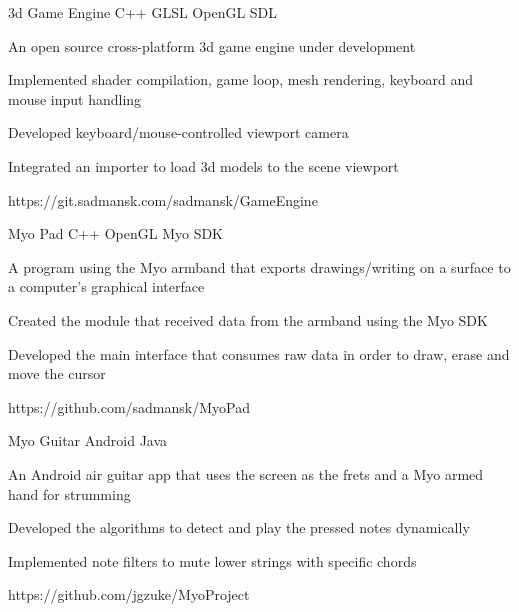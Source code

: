 



\begin{cvprojects}

\cvproject
{3d Game Engine}
{C++ \textbullet{} GLSL \textbullet{} OpenGL \textbullet{} SDL}
{
An open source cross-platform 3d game engine under development
\begin{cvitems}
\item[]
\item {Implemented shader compilation, game loop, mesh rendering, keyboard and mouse input handling}
\item {Developed keyboard/mouse-controlled viewport camera} 
\item {Integrated an importer to load 3d models to the scene viewport} 
\end{cvitems}
}
{https://git.sadmansk.com/sadmansk/GameEngine}


\cvproject
{Myo Pad}
{C++ \textbullet{} OpenGL \textbullet{} Myo SDK}
{
A program using the Myo armband that exports drawings/writing on a surface to a computer's graphical interface 
\begin{cvitems}
\item[]
\item {Created the module that received data from the armband using the Myo SDK}
\item {Developed the main interface that consumes raw data in order to draw, erase and move the cursor}
\end{cvitems}
}
{https://github.com/sadmansk/MyoPad}


\cvproject
{Myo Guitar}
{Android \textbullet{} Java}
{
An Android air guitar app that uses the screen as the frets and a Myo armed hand for strumming
\begin{cvitems}
\item[]
\item {Developed the algorithms to detect and play the pressed notes dynamically}
\item {Implemented note filters to mute lower strings with specific chords}
\end{cvitems}
}
{https://github.com/jgzuke/MyoProject}


\end{cvprojects}
